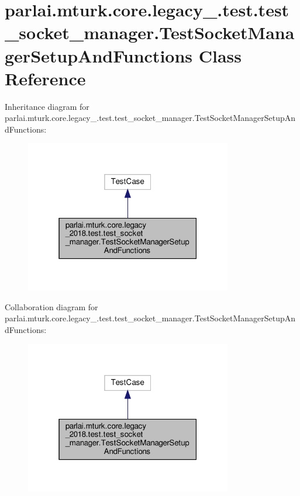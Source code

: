 \hypertarget{classparlai_1_1mturk_1_1core_1_1legacy__2018_1_1test_1_1test__socket__manager_1_1TestSocketManagerSetupAndFunctions}{}\section{parlai.\+mturk.\+core.\+legacy\+\_.\+test.\+test\+\_\+socket\+\_\+manager.\+Test\+Socket\+Manager\+Setup\+And\+Functions Class Reference}
\label{classparlai_1_1mturk_1_1core_1_1legacy__2018_1_1test_1_1test__socket__manager_1_1TestSocketManagerSetupAndFunctions}


Inheritance diagram for parlai.\+mturk.\+core.\+legacy\+\_.\+test.\+test\+\_\+socket\+\_\+manager.\+Test\+Socket\+Manager\+Setup\+And\+Functions\+:\nopagebreak
\begin{figure}[H]
\begin{center}
\leavevmode
\includegraphics[width=256pt]{db/d7b/classparlai_1_1mturk_1_1core_1_1legacy__2018_1_1test_1_1test__socket__manager_1_1TestSocketManagdc7d4986cee69f28ae406067aaf1776b}
\end{center}
\end{figure}


Collaboration diagram for parlai.\+mturk.\+core.\+legacy\+\_.\+test.\+test\+\_\+socket\+\_\+manager.\+Test\+Socket\+Manager\+Setup\+And\+Functions\+:\nopagebreak
\begin{figure}[H]
\begin{center}
\leavevmode
\includegraphics[width=256pt]{dc/dd0/classparlai_1_1mturk_1_1core_1_1legacy__2018_1_1test_1_1test__socket__manager_1_1TestSocketManag9ab558bc9a7df0d6e3e8ba6abd77dc1d}
\end{center}
\end{figure}
